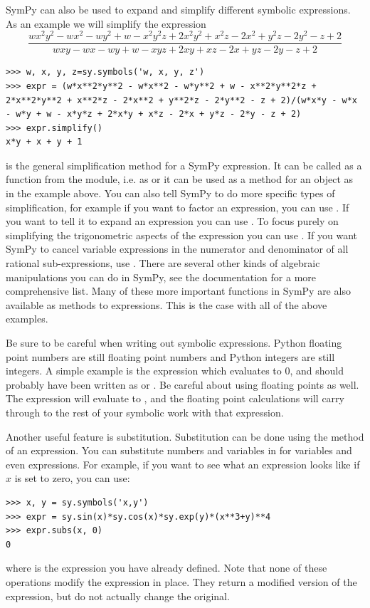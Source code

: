 SymPy can also be used to expand and simplify different symbolic expressions.
As an example we will simplify the expression
\begin{equation*}
\frac{w x^2 y^2 - w x^2 - w y^2 + w - x^2 y^2 z + 2 x^2 y^2 + x^2 z - 2 x^2 + y^2 z - 2 y^2 - z + 2}{w x y - w x - w y + w - x y z + 2 x y + x z - 2 x + y z - 2 y - z + 2}
\end{equation*}
\begin{lstlisting}
>>> w, x, y, z=sy.symbols('w, x, y, z')
>>> expr = (w*x**2*y**2 - w*x**2 - w*y**2 + w - x**2*y**2*z + 2*x**2*y**2 + x**2*z - 2*x**2 + y**2*z - 2*y**2 - z + 2)/(w*x*y - w*x - w*y + w - x*y*z + 2*x*y + x*z - 2*x + y*z - 2*y - z + 2)
>>> expr.simplify()
x*y + x + y + 1
\end{lstlisting}
 is the general simplification method for a SymPy expression.
It can be called as a function from the module, i.e. as  or it can be used as a method for an object as in the example above.
You can also tell SymPy to do more specific types of simplification, for example if you want to factor an expression, you can use .
If you want to tell it to expand an expression you can use .
To focus purely on simplifying the trigonometric aspects of the expression you can use .
If you want SymPy to cancel variable expressions in the numerator and denominator of all rational sub-expressions, use .
There are several other kinds of algebraic manipulations you can do in SymPy, see the documentation for a more comprehensive list.
Many of these more important functions in SymPy are also available as methods to expressions.
This is the case with all of the above examples.

Be sure to be careful when writing out symbolic expressions.
Python floating point numbers are still floating point numbers and Python integers are still integers.
A simple example is the expression  which evaluates to 0, and should probably have been written as  or .
Be careful about using floating points as well.
The expression  will evaluate to , and the floating point calculations will carry through to the rest of your symbolic work with that expression.

Another useful feature is substitution.
Substitution can be done using the  method of an expression.
You can substitute numbers and variables in for variables and even expressions.
For example, if you want to see what an expression looks like if $x$ is set to zero, you can use:
\begin{lstlisting}
>>> x, y = sy.symbols('x,y')
>>> expr = sy.sin(x)*sy.cos(x)*sy.exp(y)*(x**3+y)**4
>>> expr.subs(x, 0)
0
\end{lstlisting}
where  is the expression you have already defined.
Note that none of these operations modify the expression in place.
They return a modified version of the expression, but do not actually change the original.

